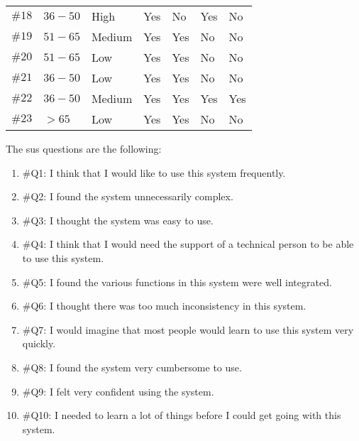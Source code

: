 \begin{table}
\begin{tabular}{r l l l l l l}
  $\#18$ & $36-50$ 	     & High		   & Yes		      & No			   & Yes		& No	\\
  $\#19$ & $51-65$ 	     & Medium		   & Yes		      & Yes			   & No			& No	\\
  $\#20$ & $51-65$ 	     & Low		   & Yes		      & Yes			   & No			& No	\\
  $\#21$ & $36-50$ 	     & Low		   & Yes		      & Yes			   & No			& No	\\
  $\#22$ & $36-50$ 	     & Medium		   & Yes		      & Yes			   & Yes		& Yes	\\
  $\#23$ & $>65$	 	     & Low		   & Yes		      & Yes			   & No			& No	\\
  \hline
\end{tabular}
\end{table}

The \ac{sus} questions are the following:
\begin{enumerate}
  \item \#Q1: I think that I would like to use this system frequently.
  \item \#Q2: I found the system unnecessarily complex.
  \item \#Q3: I thought the system was easy to use.
  \item \#Q4: I think that I would need the support of a technical person to be 
  able to use this system.
  \item \#Q5: I found the various functions in this system were well integrated.
  \item \#Q6: I thought there was too much inconsistency in this system.
  \item \#Q7: I would imagine that most people would learn to use this system 
  very quickly.
  \item \#Q8: I found the system very cumbersome to use.
  \item \#Q9: I felt very confident using the system.
  \item \#Q10: I needed to learn a lot of things before I could get going with 
  this system.
\end{enumerate}

